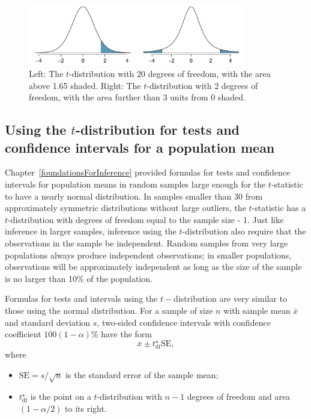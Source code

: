 \begin{figure}
\centering
\includegraphics[width=0.85\textwidth]{ch_inference_for_means_oi_biostat/figures/tDistDF20RightTail1Point65/tDistDF20RightTail1Point65}
\caption{Left: The $t$-distribution with 20 degrees of freedom, with the area above 1.65 shaded. Right: The $t$-distribution with 2 degrees of freedom, with the area further than 3 units from 0 shaded.}
\label{tDistDF20RightTail1Point65}
\end{figure}


\subsection{Using the $t$-distribution for tests and confidence intervals for a population mean}
\label{oneSampleTConfidenceIntervalsTests}

Chapter~\ref{foundationsForInference} provided formulas for tests and confidence intervals for population means in random samples large enough for the $t$-statistic to have a nearly normal distribution.  In samples smaller than 30 from approximately symmetric distributions without large outliers, the $t$-statistic has a $t$-distribution with degrees of freedom equal to the sample size - 1. Just like inference in larger samples, inference using the $t$-distribution also require that the observations in the sample be independent.  Random samples from very large populations always produce independent observations;  in smaller populations, observations will be approximately independent as long as the size of the sample is no larger than 10\% of the population.

Formulas for tests and intervals using the $t-$distribution are very similar to those using the normal distribution.  For a sample of size $n$ with sample mean $\overline{x}$ and standard deviation $s$, two-sided confidence intervals with confidence coefficient $100(1 - \alpha)$\% have the form
\[
    \overline{x} \pm t_{\text{df}}^{\star}\text{SE},
\]
where 
\begin{itemize}
    
    \item  $\text{SE}= s/\sqrt{n}$ is the standard error of the sample mean;
    
    \item  $t_{\text{df}}^{\star}$ is the point on a $t$-distribution with $n-1$ degrees of freedom and  area $(1 - \alpha/2)$ to its right.
\end{itemize}

